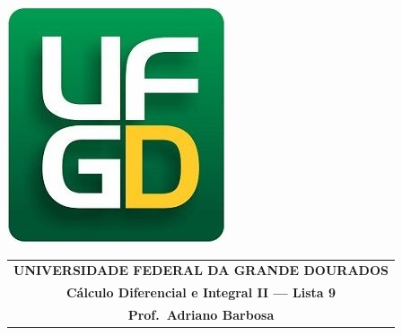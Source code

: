 \documentclass[a4paper,5pt]{amsbook}
\begin{document}
\thispagestyle{empty}
\pagestyle{empty}
\begin{minipage}[h]{0.14\textwidth}
    \includegraphics[scale=0.24]{../../ufgd.png}
\end{minipage}
\begin{minipage}[h]{\textwidth}
    \begin{tabular}{c}
        {{\bf UNIVERSIDADE FEDERAL DA GRANDE DOURADOS}}\\
        {{\bf C\'{a}lculo Diferencial e Integral II --- Lista 9}}\\
        {{\bf Prof.\ Adriano Barbosa}}\\
    \end{tabular}
    \vspace{-0.45cm}
\end{minipage}

\end{document}
